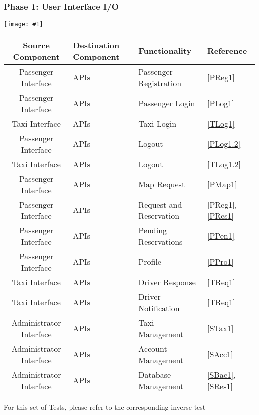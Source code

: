 \documentclass[11pt, a4paper,titlepage]{article}
\newcommand{\image}[1]{
	\begin{center}
		\noindent \texttt{[image: \#1]}
	\end{center}
}
\begin{document}
	\subsubsection{Phase 1: User Interface I/O}
	\image{test_phase1.png}
	\begin{tabularx}{\textwidth}{| c | X | X | X |}
		\hline \textbf{Source Component} &\textbf{Destination Component}&\textbf{Functionality} & \textbf{Reference} \\
		\hline Passenger Interface & APIs & Passenger Registration & \ref{PReg1} \\
		\hline Passenger Interface & APIs & Passenger Login & \ref{PLog1}\\
		\hline Taxi Interface & APIs & Taxi Login & \ref{TLog1}\\
		\hline Passenger Interface & APIs & Logout & \ref{PLog1.2}\\
		\hline Taxi Interface & APIs & Logout &\ref{TLog1.2}\\
		\hline Passenger Interface & APIs & Map Request & \ref{PMap1}\\
		\hline Passenger Interface & APIs &  Request and Reservation & \ref{PReg1}, \ref{PRes1}\\
		\hline Passenger Interface & APIs & Pending Reservations & \ref{PPen1}\\
		\hline Passenger Interface & APIs & Profile &\ref{PPro1}\\
		\hline Taxi Interface & APIs & Driver Response & \ref{TReq1}\\
		\hline Taxi Interface & APIs & Driver Notification &\ref{TReq1}\\
		\hline Administrator Interface & APIs & Taxi Management &\ref{STax1}\\
		\hline Administrator Interface & APIs & Account Management & \ref{SAcc1}\\
		\hline Administrator Interface & APIs & Database Management & \ref{SBac1}, \ref{SRes1}\\
		\hline
	\end{tabularx}
	\newpage
	For this set of Tests, please refer to the corresponding inverse test \newline
	
\end{document}
